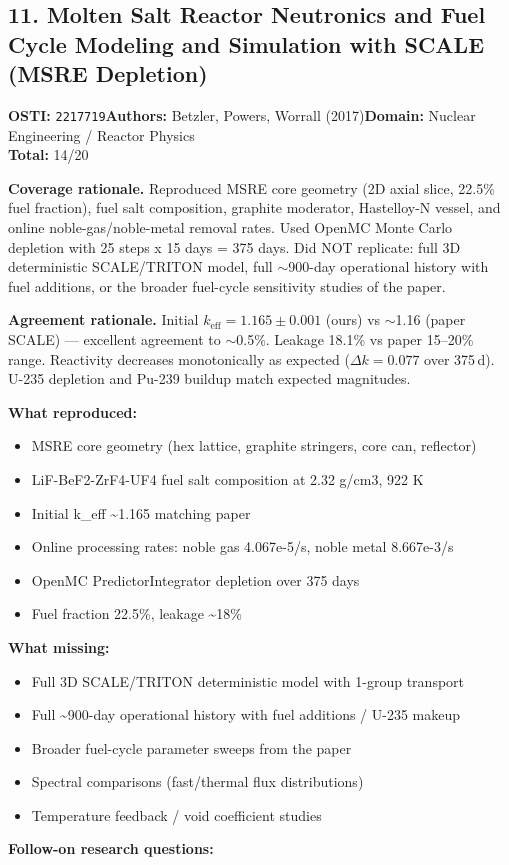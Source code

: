 \subsection{11. Molten Salt Reactor Neutronics and Fuel Cycle Modeling and Simulation with SCALE (MSRE Depletion)}
\textbf{OSTI:} \texttt{2217719}\quad\textbf{Authors:} Betzler, Powers, Worrall (2017)\quad\textbf{Domain:} Nuclear Engineering / Reactor Physics\\
\quad{}\quad\textbf{Total:} 14/20\par\smallskip
\noindent\textbf{Coverage rationale.} Reproduced MSRE core geometry (2D axial slice, 22.5\% fuel fraction), fuel salt composition, graphite moderator, Hastelloy-N vessel, and online noble-gas/noble-metal removal rates. Used OpenMC Monte Carlo depletion with 25 steps x 15 days = 375 days. Did NOT replicate: full 3D deterministic SCALE/TRITON model, full $\sim$900-day operational history with fuel additions, or the broader fuel-cycle sensitivity studies of the paper.\par
\noindent\textbf{Agreement rationale.} Initial $k_\mathrm{eff} = 1.165 \pm 0.001$ (ours) vs $\sim$1.16 (paper SCALE) --- excellent agreement to $\sim$0.5\%. Leakage 18.1\% vs paper 15--20\% range. Reactivity decreases monotonically as expected ($\Delta k = 0.077$ over 375\,d). U-235 depletion and Pu-239 buildup match expected magnitudes.\par\smallskip
\noindent\textbf{What reproduced:}
\begin{itemize}[leftmargin=1.4em,itemsep=0.2em,topsep=0.2em]
\item MSRE core geometry (hex lattice, graphite stringers, core can, reflector)
\item LiF-BeF2-ZrF4-UF4 fuel salt composition at 2.32 g/cm3, 922 K
\item Initial k\_eff \textasciitilde{}1.165 matching paper
\item Online processing rates: noble gas 4.067e-5/s, noble metal 8.667e-3/s
\item OpenMC PredictorIntegrator depletion over 375 days
\item Fuel fraction 22.5\%, leakage \textasciitilde{}18\%
\end{itemize}\noindent\textbf{What missing:}
\begin{itemize}[leftmargin=1.4em,itemsep=0.2em,topsep=0.2em]
\item Full 3D SCALE/TRITON deterministic model with 1-group transport
\item Full \textasciitilde{}900-day operational history with fuel additions / U-235 makeup
\item Broader fuel-cycle parameter sweeps from the paper
\item Spectral comparisons (fast/thermal flux distributions)
\item Temperature feedback / void coefficient studies
\end{itemize}\noindent\textbf{Follow-on research questions:}
